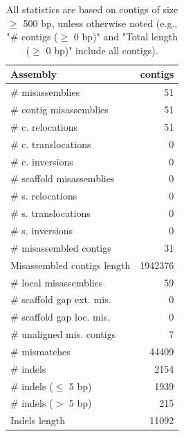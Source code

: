 \documentclass[12pt,a4paper]{article}
\begin{document}
\begin{table}[ht]
\begin{center}
\caption{All statistics are based on contigs of size $\geq$ 500 bp, unless otherwise noted (e.g., "\# contigs ($\geq$ 0 bp)" and "Total length ($\geq$ 0 bp)" include all contigs).}
\begin{tabular}{|l*{1}{|r}|}
\hline
Assembly & contigs \\ \hline
\# misassemblies & 51 \\ \hline
\hspace{2mm}\# contig misassemblies & 51 \\ \hline
\hspace{5mm}\# c. relocations & 51 \\ \hline
\hspace{5mm}\# c. translocations & 0 \\ \hline
\hspace{5mm}\# c. inversions & 0 \\ \hline
\hspace{2mm}\# scaffold misassemblies & 0 \\ \hline
\hspace{5mm}\# s. relocations & 0 \\ \hline
\hspace{5mm}\# s. translocations & 0 \\ \hline
\hspace{5mm}\# s. inversions & 0 \\ \hline
\# misassembled contigs & 31 \\ \hline
Misassembled contigs length & 1942376 \\ \hline
\# local misassemblies & 59 \\ \hline
\# scaffold gap ext. mis. & 0 \\ \hline
\# scaffold gap loc. mis. & 0 \\ \hline
\# unaligned mis. contigs & 7 \\ \hline
\# mismatches & 44409 \\ \hline
\# indels & 2154 \\ \hline
\hspace{5mm}\# indels ($\leq$ 5 bp) & 1939 \\ \hline
\hspace{5mm}\# indels ($>$ 5 bp) & 215 \\ \hline
Indels length & 11092 \\ \hline
\end{tabular}
\end{center}
\end{table}
\end{document}

